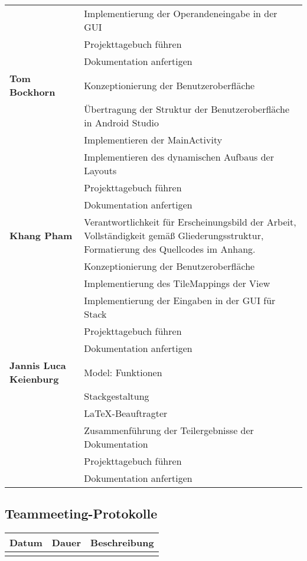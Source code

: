 {\begin{longtable}{|l|p{26em}|}
		& Implementierung der Operandeneingabe in der GUI \\
		& Projekttagebuch führen \\
		& Dokumentation anfertigen \\
		\hline
		\textbf{Tom Bockhorn}
		& Konzeptionierung der Benutzeroberfläche \\
		& Übertragung der Struktur der Benutzeroberfläche in Android Studio \\
		& Implementieren der MainActivity \\
		& Implementieren des dynamischen Aufbaus der Layouts \\
		& Projekttagebuch führen \\
		& Dokumentation anfertigen \\
		\hline
		\textbf{Khang Pham}
		& Verantwortlichkeit für Erscheinungsbild der Arbeit, Vollständigkeit gemäß Gliederungsstruktur, Formatierung des Quellcodes im Anhang. \\
		& Konzeptionierung der Benutzeroberfläche \\
		& Implementierung des TileMappings der View \\
		& Implementierung der Eingaben in der GUI für Stack \\
		& Projekttagebuch führen \\
		& Dokumentation anfertigen \\
		\hline
		\textbf{Jannis Luca Keienburg}
		& Model: Funktionen \\
		& Stackgestaltung \\
		& LaTeX-Beauftragter \\
		& Zusammenführung der Teilergebnisse der Dokumentation \\
		& Projekttagebuch führen \\
		& Dokumentation anfertigen \\
	\end{longtable}
\clearpage

\subsection{Teammeeting-Protokolle}

{\def\arraystretch{1.25}\tabcolsep=5pt
\begin{longtable}{|l|l|p{11cm}|}
	\hline
	\textbf{Datum} & \textbf{Dauer} & \textbf{Beschreibung}
	\\ \hline \hline
	\endfirsthead
	
	\hline
	\endhead
	
	\hline
	\endfoot
	

\end{longtable}}}
